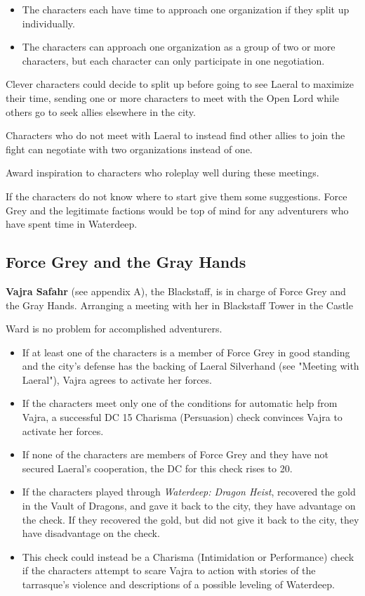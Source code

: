 \documentclass[10pt,a4paper,twoside,bg=print,twocolumn,openany,nodeprecatedcode]{dndbook}
\begin{document}
\begin{itemize}
\item The characters each have time to approach one organization if they split up individually.
\item The characters can approach one organization as a group of two or more characters, but each character can only participate in one negotiation.
\end{itemize}

Clever characters could decide to split up before going to see Laeral to maximize their time, sending one or more characters to meet with the Open Lord while others go to seek allies elsewhere in the city.

Characters who do not meet with Laeral to instead find other allies to join the fight can negotiate with two organizations instead of one.

Award inspiration to characters who roleplay well during these meetings.

If the characters do not know where to start give them some suggestions. Force Grey and the legitimate factions would be top of mind for any adventurers who have spent time in Waterdeep.

\subsection{Force Grey and the Gray Hands}
\textbf{Vajra Safahr} (see appendix A), the Blackstaff, is in charge of Force Grey and the Gray Hands. Arranging a meeting with her in Blackstaff Tower in the Castle

Ward is no problem for accomplished adventurers.


\begin{itemize}
\item If at least one of the characters is a member of Force Grey in good standing and the city's defense has the backing of Laeral Silverhand (see "Meeting  with Laeral"), Vajra agrees to activate her forces.
\item If the characters meet only one of the conditions for automatic help from Vajra, a successful DC 15 Charisma (Persuasion) check convinces Vajra to activate her forces.
\item If none of the characters are members of Force Grey and they have not secured Laeral's cooperation, the DC for this check rises to 20.
\item If the characters played through \textit{Waterdeep: Dragon Heist}, recovered the gold in the Vault of Dragons, and gave it back to the city, they have advantage on the check. If they recovered the gold, but did not give it back to the city, they have disadvantage on the check.
\item This check could instead be a Charisma (Intimidation or Performance) check if the characters attempt to scare Vajra to action with stories of the tarrasque's violence and descriptions of a possible leveling of Waterdeep.
\end{itemize}
\end{document}
